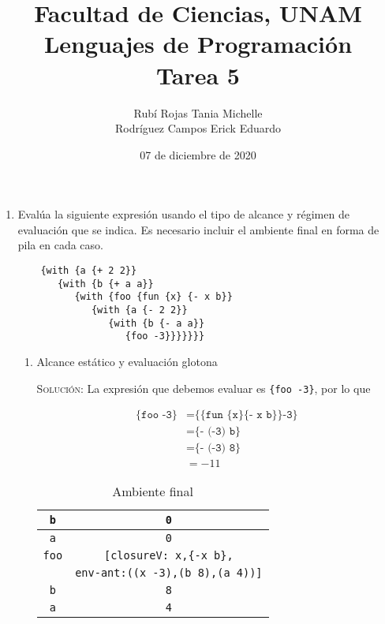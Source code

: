 \documentclass[letterpaper,11pt]{article}
\title{Facultad de Ciencias, UNAM \\ 
       Lenguajes de Programación\\ 
       Tarea 5}
\author{Rubí Rojas Tania Michelle\\ Rodríguez Campos Erick Eduardo}
\date{07 de diciembre de 2020}
\begin{document}
\maketitle

\begin{enumerate}
    \item Evalúa la siguiente expresión usando el tipo de alcance y régimen de 
    evaluación que se indica. Es necesario incluir el ambiente final en forma 
    de pila en cada caso. 
    \begin{verbatim}
    {with {a {+ 2 2}}
       {with {b {+ a a}}
          {with {foo {fun {x} {- x b}}
             {with {a {- 2 2}}
                {with {b {- a a}}
                   {foo -3}}}}}}}
    \end{verbatim}

    \begin{enumerate}
        \item Alcance estático y evaluación glotona

        \textsc{Solución:} La expresión que debemos evaluar es 
        \texttt{\{foo -3\}}, por lo que 
        \begin{table}[h]
            \parbox{.55\linewidth}{
            \centering
            \begin{align*}
                \texttt{\{foo -3\}} 
                &= \texttt{\{\{fun \{x\} \{- x b\}\} -3\}} \\
                &= \texttt{\{- (-3) b\}} \\
                &= \texttt{\{- (-3) 8\}} \\
                &= -11
            \end{align*}
            }
            \hfill
            \parbox{.45\linewidth}{
            \centering
            \begin{tabular}{|c|c|}
            \hline
            \texttt{b} & \texttt{0} \\
            \hline
            \texttt{a} & \texttt{0} \\
            \hline
            \texttt{foo} & \texttt{[closureV: x,\{-x b\},} \\
             & \texttt{env-ant:((x -3),(b 8),(a 4))]} \\
            \hline
            \texttt{b} & \texttt{8} \\
            \hline
            \texttt{a} & \texttt{4} \\
            \hline
            \end{tabular}
            \caption{Ambiente final}
            }
        \end{table}


\end{enumerate}
\end{enumerate}
\end{document}
